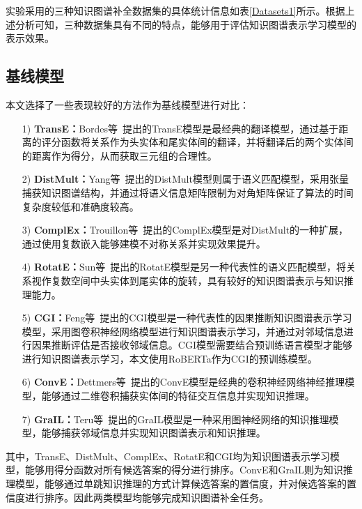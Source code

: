 \documentclass[algorithmlist, AutoFakeBold, AutoFakeSlant, figurelist, tablelist, nomlist, engineering]{seuthesix}
\begin{document}
实验采用的三种知识图谱补全数据集的具体统计信息如表\ref{Datasets1}所示。根据上述分析可知，三种数据集具有不同的特点，能够用于评估知识图谱表示学习模型的表示效果。

\subsection{基线模型}
本文选择了一些表现较好的方法作为基线模型进行对比：
\begin{itemize}
  \item [1)]\textbf{TransE：}Bordes等~\cite{bordes2013translating}提出的TransE模型是最经典的翻译模型，通过基于距离的评分函数将关系作为头实体和尾实体间的翻译，并将翻译后的两个实体间的距离作为得分，从而获取三元组的合理性。
  \item [2)]\textbf{DistMult：}Yang等~\cite{yang2015embedding}提出的DistMult模型则属于语义匹配模型，采用张量捕获知识图谱结构，并通过将语义信息矩阵限制为对角矩阵保证了算法的时间复杂度较低和准确度较高。
  \item [3)]\textbf{ComplEx：}Trouillon等~\cite{trouillon2016complex}提出的ComplEx模型是对DistMult的一种扩展，通过使用复数嵌入能够建模不对称关系并实现效果提升。
  \item [4)]\textbf{RotatE：}Sun等~\cite{sun2018rotate}提出的RotatE模型是另一种代表性的语义匹配模型，将关系视作复数空间中头实体到尾实体的旋转，具有较好的知识图谱表示与知识推理能力。
  \item [5)]\textbf{CGI：}Feng等~\cite{feng2021should}提出的CGI模型是一种代表性的因果推断知识图谱表示学习模型，采用图卷积神经网络模型进行知识图谱表示学习，并通过对邻域信息进行因果推断评估是否接收邻域信息。CGI模型需要结合预训练语言模型才能够进行知识图谱表示学习，本文使用RoBERTa作为CGI的预训练模型。
  \item [6)]\textbf{ConvE：}Dettmers等~\cite{dettmers2018convolutional}提出的ConvE模型是经典的卷积神经网络神经推理模型，能够通过二维卷积捕获实体间的特征交互信息并实现知识推理。
  \item [7)]\textbf{GraIL：}Teru等~\cite{teru2020inductive}提出的GraIL模型是一种采用图神经网络的知识推理模型，能够捕获邻域信息并实现知识图谱表示和知识推理。
\end{itemize}

其中，TransE、DistMult、ComplEx、RotatE和CGI均为知识图谱表示学习模型，能够用得分函数对所有候选答案的得分进行排序。ConvE和GraIL则为知识推理模型，能够通过单跳知识推理的方式计算候选答案的置信度，并对候选答案的置信度进行排序。因此两类模型均能够完成知识图谱补全任务。
\end{document}
